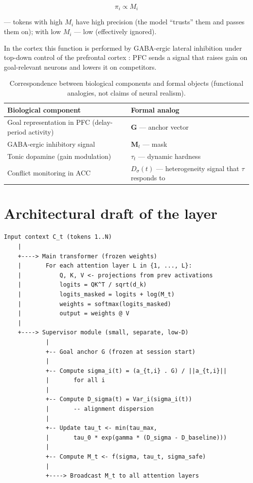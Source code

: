 \documentclass[12pt,a4paper]{article}
\begin{document}
\begin{equation}
\pi_i \propto M_i
\end{equation}

--- tokens with high $M_i$ have high precision (the model ``trusts'' them and passes them on); with low $M_i$ --- low (effectively ignored).

In the cortex this function is performed by GABA-ergic lateral inhibition under top-down control of the prefrontal cortex \cite{desimone1995, miller2001}: PFC sends a signal that raises gain on goal-relevant neurons and lowers it on competitors.

\begin{table}[h]
\centering
\begin{tabular}{p{6cm}p{8.5cm}}
\toprule
\textbf{Biological component} & \textbf{Formal analog} \\
\midrule
Goal representation in PFC (delay-period activity) & $\mathbf{G}$ --- anchor vector \\
GABA-ergic inhibitory signal & $\mathbf{M}_t$ --- mask \\
Tonic dopamine (gain modulation) & $\tau_t$ --- dynamic hardness \\
Conflict monitoring in ACC & $D_\sigma(t)$ --- heterogeneity signal that $\tau$ responds to \\
\bottomrule
\end{tabular}
\caption{Correspondence between biological components and formal objects (functional analogies, not claims of neural realism).}
\end{table}

\section{Architectural draft of the layer}

\begingroup\footnotesize
\begin{verbatim}
Input context C_t (tokens 1..N)
    |
    +----> Main transformer (frozen weights)
    |       For each attention layer L in {1, ..., L}:
    |           Q, K, V <- projections from prev activations
    |           logits = QK^T / sqrt(d_k)
    |           logits_masked = logits + log(M_t)
    |           weights = softmax(logits_masked)
    |           output = weights @ V
    |
    +----> Supervisor module (small, separate, low-D)
            |
            +-- Goal anchor G (frozen at session start)
            |
            +-- Compute sigma_i(t) = (a_{t,i} . G) / ||a_{t,i}||
            |       for all i
            |
            +-- Compute D_sigma(t) = Var_i(sigma_i(t))
            |       -- alignment dispersion
            |
            +-- Update tau_t <- min(tau_max,
            |       tau_0 * exp(gamma * (D_sigma - D_baseline)))
            |
            +-- Compute M_t <- f(sigma, tau_t, sigma_safe)
            |
            +----> Broadcast M_t to all attention layers
\end{verbatim}
\endgroup
\end{document}
